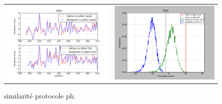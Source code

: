 \documentclass[a4paper,12pt]{article}
\begin{document}
   \begin{figure}[t]
     \centering
     \begin{tabular}{cc}
       \includegraphics[width=8.45cm]{gen_08032012/1R6J/ph/graph_simil_bypos.png} &
       \includegraphics[width=8.45cm]{gen_08032012/1R6J/ph/graph_simil_byseq.png} \\

     \end{tabular}

     \caption{similarité protocole ph.}
   \end{figure}
\end{document}
